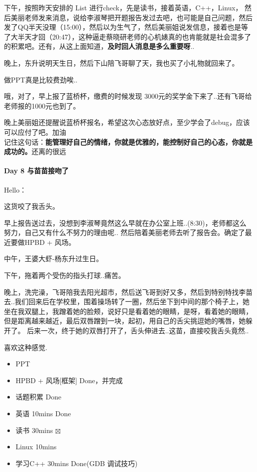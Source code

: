 \documentclass[UTF8,a4paper,8pt]{ctexbook}
\begin{document}
	 	 下午，按照昨天安排的 List 进行check，先是读书，接着英语，C++，Linux， 然后美丽老师发来消息，说给李淑琴把开题报告发过去吧，也可能是自己问题，然后发了QQ半天没理（15:00），然后以为生气了，然后美丽姐说发信息，接着也是等了大半天才回（20:47），这种逼走蔡晓研老师的心机婊真的也肯能就是社会混多了的积累吧。还有，从这上面知道，\textbf{及时回人消息是多么重要呀}..
	 	 
	 	 晚上，东升说明天生日，然后下山陪飞哥聊了天，我也买了小礼物就回来了。
	 	 
	 	 做PPT真是比较费劲唉..
	 	 
	 	 哦，对了，早上报了蓝桥杯，缴费的时候发现 3000元的奖学金下来了..还有飞哥给老师报的1000元也到了。
	 	 
	 	 晚上美丽姐还提醒说蓝桥杯报名，希望这次心态放好点，至少学会了debug，应该可以应付了吧。加油\\
	 	 
	 	 记住这句话：\textbf{能管理好自己的情绪，你就是优雅的，能控制好自己的心态，你就是成功的。}还离的很远
	 	 
 	 \paragraph{Day 8   与苗苗接吻了    \quad     }Hello：
 	 
	 	 这货咬了我舌头。
	 	 
	 	 早上报告送过去，没想到李淑琴竟然这么早就在办公室上班..(8:30)，老师都这么努力，自己又有什么不努力的理由呢.. 然后陪着美丽老师去听了报告会。确定了最近要做HPBD + 风场。
	 	 
	 	 中午，王婆大虾-杨东升过生日。
	 	 
	 	 下午，拖着两个受伤的指头打球..痛苦。
	 	 
	 	 晚上，洗完澡，飞哥陪我去阳光超市，然后送飞哥到好又多，然后到特别特找李苗去..我们回来后在学校里，围着操场转了一圈，然后坐下到中间的那个椅子上，她坐在我双腿上，我蹭着她的脸颊，说好只是看着她的眼睛，是呀，看着她的眼睛，但是距离越来越近，最后双唇蹭到一块，起初，用自己的舌尖挑逗她的嘴唇，她躲开了。 后来一次，终于她的双唇打开了，舌头伸进去..这苗，直接咬我舌头竟然..
	 	 
	 	 喜欢这种感觉.
	 	 
	 	 	 	 \begin{itemize}
	 	 	 	 	\item  PPT	 \makebox[0pt][l]{$\square$}\raisebox{.15ex}{\hspace{0.1em}$\checkmark$}
	 	 	 	 	\item  HPBD  + 风场[框架]	Done，并完成
	 	 	 	 	\item  话题积累 	Done
	 	 	 	 	\item  英语 10mins 	Done 
	 	 	 	 	\item  读书 30mins	$\boxtimes$
	 	 	 	 	\item  Linux 10mins	 \makebox[0pt][l]{$\square$}{$\times$}
	 	 	 	 	\item  学习C++ 30mins  Done(GDB 调试技巧)
	 	 	 	 \end{itemize}
\end{document}
